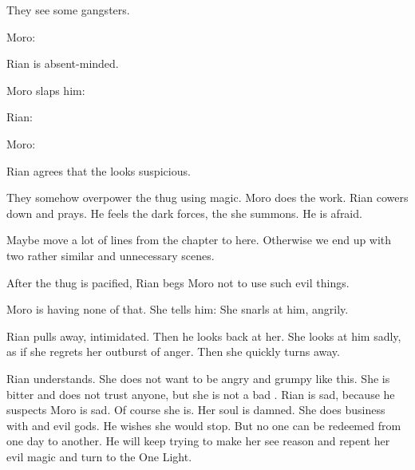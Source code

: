 They see some gangsters.

Moro:

Rian is absent-minded.

Moro slaps him: 

Rian:

Moro:

Rian agrees that the \scatha looks suspicious. 



\begin{comment}
  \section{Capturing the victim}
\end{comment}

They somehow overpower the thug using magic. 
Moro does the work.
Rian cowers down and prays. 
He feels the dark forces, the \daemons she summons.
He is afraid. 

Maybe move a lot of lines from the  chapter to here.
Otherwise we end up with two rather similar and unnecessary scenes. 

After the thug is pacified, Rian begs Moro not to use such evil things. 

Moro is having none of that. 
She tells him: 
She snarls at him, angrily.

Rian pulls away, intimidated.
Then he looks back at her. 
She looks at him sadly, as if she regrets her outburst of anger. 
Then she quickly turns away. 

Rian understands.
She does not want to be angry and grumpy like this.
She is bitter and does not trust anyone, but she is not a bad \scatha. 
Rian is sad, because he suspects Moro is sad. 
Of course she is.
Her soul is damned. 
She does business with \daemons and evil gods. 
He wishes she would stop.
But no one can be redeemed from one day to another. 
He will keep trying to make her see reason and repent her evil magic and turn to the One Light. 



\begin{comment}
  \section{Interrogating the victim}
\end{comment}

